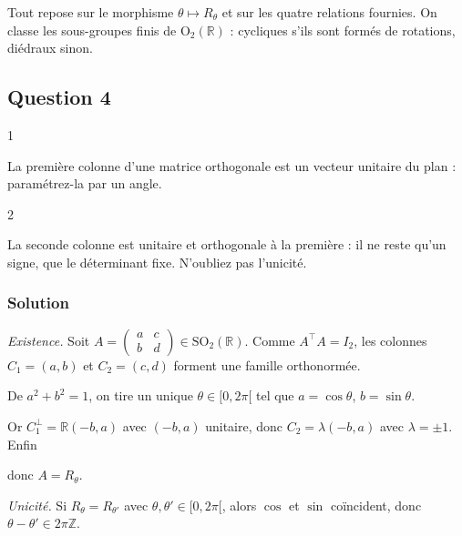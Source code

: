 \documentclass[11pt,a4paper]{article}
\newcommand{\equationajustee}[1]{%
  \sbox{\boiteequation}{$\displaystyle #1$}%
  \ifdim\wd\boiteequation>\linewidth
    \[\resizebox{\linewidth}{!}{\usebox{\boiteequation}}\]%
  \else
    \[#1\]%
  \fi}
\begin{document}
Tout repose sur le morphisme \(\theta\mapsto R_\theta\) et sur les quatre relations fournies. On classe les sous-groupes finis de \({\mathrm{O}}_2(\mathbb{R})\) : cycliques s'ils sont formés de rotations, diédraux sinon.

\hypertarget{question-4}{%
\subsection{Question 4}\label{question-4}}

\begin{indication}{1}

La première colonne d'une matrice orthogonale est un vecteur unitaire du plan : paramétrez-la par un angle.

\end{indication}

\begin{indication}{2}

La seconde colonne est unitaire et orthogonale à la première : il ne reste qu'un signe, que le déterminant fixe. N'oubliez pas l'unicité.

\end{indication}

\hypertarget{solution-3}{%
\subsubsection{Solution}\label{solution-3}}

\emph{Existence.} Soit \(A=\begin{pmatrix}a&c\\b&d\end{pmatrix}\in{\mathrm{SO}}_2(\mathbb{R})\). Comme \(A^\top A=I_2\), les colonnes \(C_1=(a,b)\) et \(C_2=(c,d)\) forment une famille orthonormée.

De \(a^2+b^2=1\), on tire un unique \(\theta\in[0,2\pi[\) tel que \(a=\cos\theta\), \(b=\sin\theta\).

Or \(C_1^\perp=\mathbb{R}(-b,a)\) avec \((-b,a)\) unitaire, donc \(C_2=\lambda(-b,a)\) avec \(\lambda=\pm1\). Enfin

\equationajustee{\begin{aligned}1=\det A&=ad-bc\\&=\lambda(a^2+b^2)\\&=\lambda,\end{aligned}}

donc \(A=R_\theta\).

\emph{Unicité.} Si \(R_\theta=R_{\theta'}\) avec \(\theta,\theta'\in[0,2\pi[\), alors \(\cos\) et \(\sin\) coïncident, donc \(\theta-\theta'\in2\pi\mathbb{Z}\).
\end{document}
